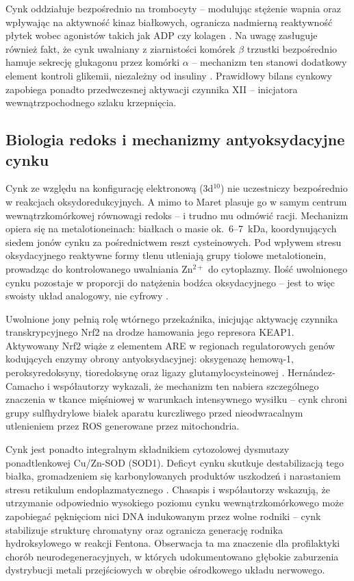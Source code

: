 \documentclass[12pt,a4paper]{article}
\begin{document}
Cynk oddziałuje bezpośrednio na trombocyty -- modulując stężenie wapnia oraz wpływając na aktywność kinaz białkowych, ogranicza nadmierną reaktywność płytek wobec agonistów takich jak ADP czy kolagen \cite{tamura2021}. Na uwagę zasługuje również fakt, że cynk uwalniany z ziarnistości komórek \(\beta\) trzustki bezpośrednio hamuje sekrecję glukagonu przez komórki \(\alpha\) -- mechanizm ten stanowi dodatkowy element kontroli glikemii, niezależny od insuliny \cite{tamura2021}. Prawidłowy bilans cynkowy zapobiega ponadto przedwczesnej aktywacji czynnika XII -- inicjatora wewnątrzpochodnego szlaku krzepnięcia.



\subsection{Biologia redoks i mechanizmy antyoksydacyjne cynku}

Cynk ze względu na konfigurację elektronową (3d\(^{10}\)) nie uczestniczy bezpośrednio w reakcjach oksydoredukcyjnych. A mimo to Maret \cite{maret2019} plasuje go w samym centrum wewnątrzkomórkowej równowagi redoks -- i trudno mu odmówić racji. Mechanizm opiera się na metalotioneinach: białkach o masie ok.\ 6--7~kDa, koordynujących siedem jonów cynku za pośrednictwem reszt cysteinowych. Pod wpływem stresu oksydacyjnego reaktywne formy tlenu utleniają grupy tiolowe metalotionein, prowadząc do kontrolowanego uwalniania Zn\(^{2+}\) do cytoplazmy. Ilość uwolnionego cynku pozostaje w proporcji do natężenia bodźca oksydacyjnego -- jest to więc swoisty układ analogowy, nie cyfrowy \cite{maret2019}.

Uwolnione jony pełnią rolę wtórnego przekaźnika, inicjując aktywację czynnika transkrypcyjnego Nrf2 na drodze hamowania jego represora KEAP1. Aktywowany Nrf2 wiąże z elementem ARE w regionach regulatorowych genów kodujących enzymy obrony antyoksydacyjnej: oksygenazę hemową-1, peroksyredoksyny, tioredoksynę oraz ligazy glutamylocysteinowej \cite{maret2019}. Hernández-Camacho i współautorzy \cite{hernandezcamacho2020} wykazali, że mechanizm ten nabiera szczególnego znaczenia w tkance mięśniowej w warunkach intensywnego wysiłku -- cynk chroni grupy sulfhydrylowe białek aparatu kurczliwego przed nieodwracalnym utlenieniem przez ROS generowane przez mitochondria.

Cynk jest ponadto integralnym składnikiem cytozolowej dysmutazy ponadtlenkowej Cu/Zn-SOD (SOD1). Deficyt cynku skutkuje destabilizacją tego białka, gromadzeniem się karbonylowanych produktów uszkodzeń i narastaniem stresu retikulum endoplazmatycznego \cite{hernandezcamacho2020}. Chasapis i współautorzy \cite{chasapis2020} wskazują, że utrzymanie odpowiednio wysokiego poziomu cynku wewnątrzkomórkowego może zapobiegać pęknięciom nici DNA indukowanym przez wolne rodniki -- cynk stabilizuje strukturę chromatyny oraz ogranicza generację rodnika hydroksylowego w reakcji Fentona. Obserwacja ta ma znaczenie dla profilaktyki chorób neurodegeneracyjnych, w których udokumentowano głębokie zaburzenia dystrybucji metali przejściowych w obrębie ośrodkowego układu nerwowego.
\end{document}
